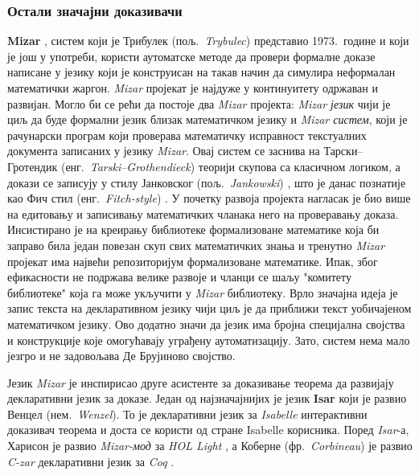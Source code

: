 \subsubsection{Остали значајни доказивачи}

\textbf{Mizar} \cite{mizar}, систем који је Трибулек
(пољ.~\emph{Trybulec}) представио 1973.~године и који је још у
употреби, користи аутоматске методе да провери формалне доказе
написане у језику који је конструисан на такав начин да симулира
неформалан математички жаргон.  \emph{Mizar} пројекат је најдуже у
континуитету одржаван и развијан. Могло би се рећи да постоје два
\emph{Mizar} пројекта: \emph{Mizar језик} чији је циљ да буде формални
језик близак математичком језику и \emph{Mizar систем}, који је
рачунарски програм који проверава математичку исправност текстуалних
документа записаних у језику \emph{Mizar}. Овај систем се заснива на
Тарски--Гротендик (енг.~\emph{Tarski--Grothendieck})
\cite{tarskiGrothendieck} теорији скупова са класичном логиком, а
докази се записују у стилу Јанковског (пољ.~\emph{Jankowski})
\cite{Jaskowski}, што је данас познатије као Фич стил
(енг.~\emph{Fitch-style}) \cite{Fitchstyle}. У почетку развоја
пројекта нагласак је био више на едитовању и записивању математичких
чланака него на проверавању доказа. Инсистирано је на креирању
библиотеке формализоване математике која би заправо била један повезан
скуп свих математичких знања и тренутно \emph{Mizar} пројекат има
највећи репозиторијум формализоване математике. Ипак, због ефикасности
не подржава велике развоје и чланци се шаљу "комитету библиотеке" која
га може укључити у \emph{Mizar} библиотеку. Врло значајна идеја је
запис текста на декларативном језику чији циљ је да приближи текст
уобичајеном математичком језику. Ово додатно значи да језик има бројна
специјална својства и конструкције које омогућавају уграђену
аутоматизацију. Зато, систем нема мало језгро и не задовољава Де
Брујиново својство.
 
Језик \emph{Mizar} је инспирисао друге асистенте за доказивање теорема
да развијају декларативни језик за доказе. Један од најзначајнијих је
језик \textbf{Isar} \cite{isar} који је развио Венцел
(нем.~\emph{Wenzel}). То је декларативни језик за \emph{Isabelle}
интерактивни доказивач теорема и доста се користи од стране Isabelle
корисника. Поред \emph{Isar}-а, Харисон је развио \emph{Mizar-мод} за
\emph{HOL Light} \cite{mizarhollight}, а Коберне
(фр.~\emph{Corbineau}) је развио \emph{C-zar} декларативни језик за
\emph{Coq} \cite{corbineau}.


